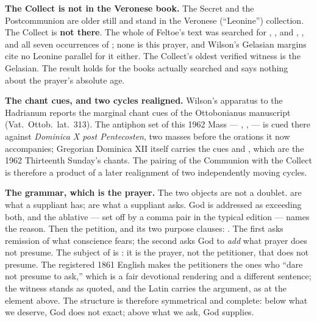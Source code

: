 \textbf{The Collect is not in the Veronese book.} The Secret and the Postcommunion are
older still and stand in the Veronese (``Leonine'') collection. The Collect is
\textbf{not there}. The whole of Feltoe's text was searched for
, ,  and
, , and all seven occurrences of
; none is this prayer, and Wilson's Gelasian margins cite no
Leonine parallel for it either. The Collect's oldest verified witness is the
Gelasian. The result holds for the books actually searched and says nothing
about the prayer's absolute age.

\textbf{The chant cues, and two cycles realigned.} Wilson's apparatus
to the Hadrianum reports the marginal chant cues of the Ottobonianus manuscript
(Vat.~Ottob.~lat.~313). The antiphon set of this 1962 Mass --- , ,  --- is
cued there against \textit{Dominica X post Pentecosten}, two masses before the
orations it now accompanies; Gregorian Dominica XII itself carries the cues
 and , which are the
1962 Thirteenth Sunday's chants. The pairing of the 
Communion with the  Collect is therefore a product
of a later realignment of two independently moving cycles.

\textbf{The grammar, which is the prayer.}  The two
objects are not a doublet.  are what a suppliant has;
 are what a suppliant asks. God is addressed as exceeding both, and
the ablative  --- set off by a comma pair in the
typical edition --- names the reason. Then the petition, and its two purpose
clauses: . The first asks remission of what conscience fears; the second asks
God to \textit{add} what prayer does not presume. The subject of
 is : it is the prayer, not the petitioner, that
does not presume. The registered 1861 English makes the petitioners the ones
who ``dare not presume to ask,'' which is a fair devotional rendering and a
different sentence; the witness stands as quoted, and the Latin carries the
argument, as at the element above. The structure is therefore symmetrical and
complete: below what we deserve, God does not exact; above what we ask, God
supplies.

